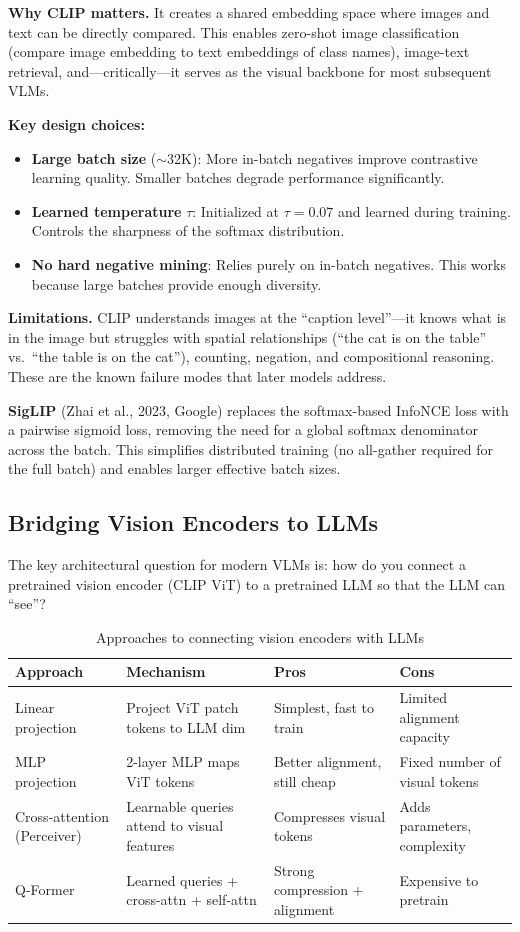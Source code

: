 \textbf{Why CLIP matters.} It creates a shared embedding space where images and text can be directly compared. This enables zero-shot image classification (compare image embedding to text embeddings of class names), image-text retrieval, and---critically---it serves as the visual backbone for most subsequent VLMs.

\textbf{Key design choices:}
\begin{itemize}
    \item \textbf{Large batch size} ($\sim$32K): More in-batch negatives improve contrastive learning quality. Smaller batches degrade performance significantly.
    \item \textbf{Learned temperature} $\tau$: Initialized at $\tau = 0.07$ and learned during training. Controls the sharpness of the softmax distribution.
    \item \textbf{No hard negative mining}: Relies purely on in-batch negatives. This works because large batches provide enough diversity.
\end{itemize}

\textbf{Limitations.} CLIP understands images at the ``caption level''---it knows what is in the image but struggles with spatial relationships (``the cat is on the table'' vs.\ ``the table is on the cat''), counting, negation, and compositional reasoning. These are the known failure modes that later models address.

\textbf{SigLIP} (Zhai et al., 2023, Google) replaces the softmax-based InfoNCE loss with a pairwise sigmoid loss, removing the need for a global softmax denominator across the batch. This simplifies distributed training (no all-gather required for the full batch) and enables larger effective batch sizes.

\subsection{Bridging Vision Encoders to LLMs}

The key architectural question for modern VLMs is: how do you connect a pretrained vision encoder (CLIP ViT) to a pretrained LLM so that the LLM can ``see''?

\begin{table}[H]
\centering
\caption{Approaches to connecting vision encoders with LLMs}
\begin{tabularx}{\textwidth}{lXXX}
\toprule
\textbf{Approach} & \textbf{Mechanism} & \textbf{Pros} & \textbf{Cons} \\
\midrule
Linear projection & Project ViT patch tokens to LLM dim & Simplest, fast to train & Limited alignment capacity \\
MLP projection & 2-layer MLP maps ViT tokens & Better alignment, still cheap & Fixed number of visual tokens \\
Cross-attention (Perceiver) & Learnable queries attend to visual features & Compresses visual tokens & Adds parameters, complexity \\
Q-Former & Learned queries + cross-attn + self-attn & Strong compression + alignment & Expensive to pretrain \\
\bottomrule
\end{tabularx}
\end{table}

